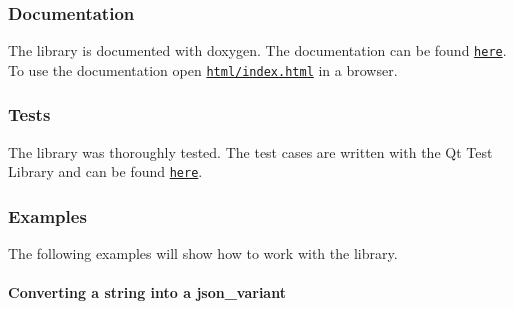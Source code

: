  \subsubsection*{\label{_doc_section}%
Documentation}

The library is documented with doxygen. The documentation can be found \href{https://github.com/n0dex/cppjsonlib/tree/master/json_library_documentation}{\tt here}. To use the documentation open \href{https://github.com/n0dex/cppjsonlib/blob/master/json_library_documentation/html/index.html}{\tt html/index.\+html} in a browser.

\subsubsection*{\label{_tests_section}%
Tests}

The library was thoroughly tested. The test cases are written with the Qt Test Library and can be found \href{https://github.com/n0dex/cppjsonlib/tree/master/json_library_tests}{\tt here}.

\subsubsection*{\label{_expamles_section}%
Examples}

The following examples will show how to work with the library.

\paragraph*{\label{_convert_a_string_to_json_section}%
Converting a string into a json\+\_\+variant}


